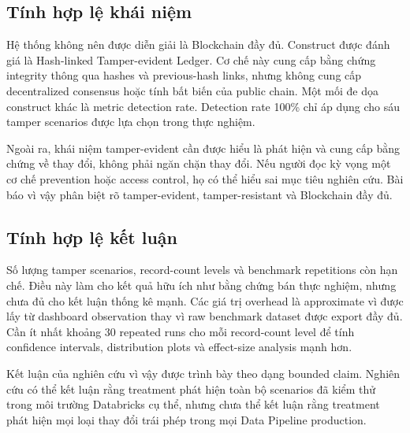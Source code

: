 \subsection{Tính hợp lệ khái niệm}

Hệ thống không nên được diễn giải là Blockchain đầy đủ. Construct được đánh giá là Hash-linked Tamper-evident Ledger. Cơ chế này cung cấp bằng chứng integrity thông qua hashes và previous-hash links, nhưng không cung cấp decentralized consensus hoặc tính bất biến của public chain. Một mối đe dọa construct khác là metric detection rate. Detection rate 100\% chỉ áp dụng cho sáu tamper scenarios được lựa chọn trong thực nghiệm.

Ngoài ra, khái niệm tamper-evident cần được hiểu là phát hiện và cung cấp bằng chứng về thay đổi, không phải ngăn chặn thay đổi. Nếu người đọc kỳ vọng một cơ chế prevention hoặc access control, họ có thể hiểu sai mục tiêu nghiên cứu. Bài báo vì vậy phân biệt rõ tamper-evident, tamper-resistant và Blockchain đầy đủ.

\subsection{Tính hợp lệ kết luận}

Số lượng tamper scenarios, record-count levels và benchmark repetitions còn hạn chế. Điều này làm cho kết quả hữu ích như bằng chứng bán thực nghiệm, nhưng chưa đủ cho kết luận thống kê mạnh. Các giá trị overhead là approximate vì được lấy từ dashboard observation thay vì raw benchmark dataset được export đầy đủ. Cần ít nhất khoảng 30 repeated runs cho mỗi record-count level để tính confidence intervals, distribution plots và effect-size analysis mạnh hơn.

Kết luận của nghiên cứu vì vậy được trình bày theo dạng bounded claim. Nghiên cứu có thể kết luận rằng treatment phát hiện toàn bộ scenarios đã kiểm thử trong môi trường Databricks cụ thể, nhưng chưa thể kết luận rằng treatment phát hiện mọi loại thay đổi trái phép trong mọi Data Pipeline production.
